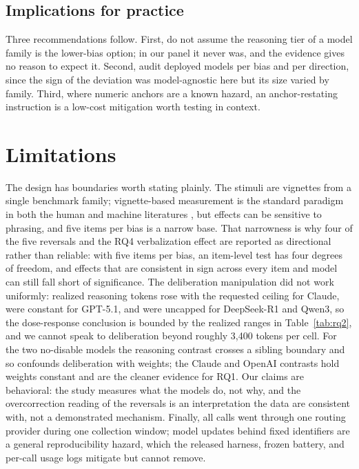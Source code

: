 \documentclass[conference]{IEEEtran}
\begin{document}
\subsection{Implications for practice}
Three recommendations follow. First, do not assume the reasoning tier of a model family is the lower-bias option; in our panel it never was, and the evidence gives no reason to expect it. Second, audit deployed models per bias and per direction, since the sign of the deviation was model-agnostic here but its size varied by family. Third, where numeric anchors are a known hazard, an anchor-restating instruction is a low-cost mitigation worth testing in context.

\section{Limitations}

The design has boundaries worth stating plainly. The stimuli are vignettes from a single benchmark family; vignette-based measurement is the standard paradigm in both the human and machine literatures \cite{tversky1974judgment, malberg2024comprehensive}, but effects can be sensitive to phrasing, and five items per bias is a narrow base. That narrowness is why four of the five reversals and the RQ4 verbalization effect are reported as directional rather than reliable: with five items per bias, an item-level test has four degrees of freedom, and effects that are consistent in sign across every item and model can still fall short of significance. The deliberation manipulation did not work uniformly: realized reasoning tokens rose with the requested ceiling for Claude, were constant for GPT-5.1, and were uncapped for DeepSeek-R1 and Qwen3, so the dose-response conclusion is bounded by the realized ranges in Table~\ref{tab:rq2}, and we cannot speak to deliberation beyond roughly 3,400 tokens per cell. For the two no-disable models the reasoning contrast crosses a sibling boundary and so confounds deliberation with weights; the Claude and OpenAI contrasts hold weights constant and are the cleaner evidence for RQ1. Our claims are behavioral: the study measures what the models do, not why, and the overcorrection reading of the reversals is an interpretation the data are consistent with, not a demonstrated mechanism. Finally, all calls went through one routing provider during one collection window; model updates behind fixed identifiers are a general reproducibility hazard, which the released harness, frozen battery, and per-call usage logs mitigate but cannot remove.
\end{document}
